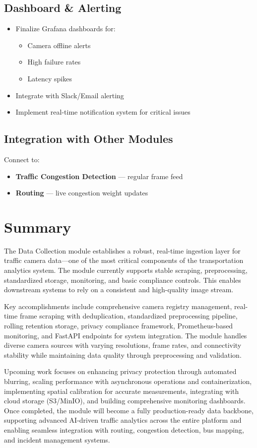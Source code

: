 \subsection{Dashboard \& Alerting}

\begin{itemize}
    \item Finalize Grafana dashboards for:
    \begin{itemize}
        \item Camera offline alerts
        \item High failure rates
        \item Latency spikes
    \end{itemize}
    \item Integrate with Slack/Email alerting
    \item Implement real-time notification system for critical issues
\end{itemize}

\subsection{Integration with Other Modules}

Connect to:

\begin{itemize}
    \item \textbf{Traffic Congestion Detection} — regular frame feed
    \item \textbf{Routing} — live congestion weight updates
\end{itemize}

\section{Summary}

The Data Collection module establishes a robust, real-time ingestion layer for traffic camera data—one of the most critical components of the transportation analytics system. The module currently supports stable scraping, preprocessing, standardized storage, monitoring, and basic compliance controls. This enables downstream systems to rely on a consistent and high-quality image stream.

Key accomplishments include comprehensive camera registry management, real-time frame scraping with deduplication, standardized preprocessing pipeline, rolling retention storage, privacy compliance framework, Prometheus-based monitoring, and FastAPI endpoints for system integration. The module handles diverse camera sources with varying resolutions, frame rates, and connectivity stability while maintaining data quality through preprocessing and validation.

Upcoming work focuses on enhancing privacy protection through automated blurring, scaling performance with asynchronous operations and containerization, implementing spatial calibration for accurate measurements, integrating with cloud storage (S3/MinIO), and building comprehensive monitoring dashboards. Once completed, the module will become a fully production-ready data backbone, supporting advanced AI-driven traffic analytics across the entire platform and enabling seamless integration with routing, congestion detection, bus mapping, and incident management systems.

